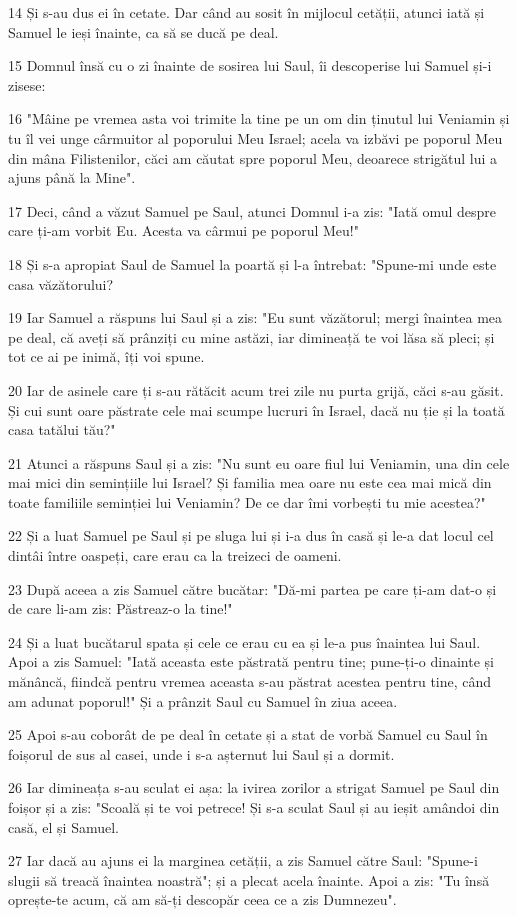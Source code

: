 \par 14 Și s-au dus ei în cetate. Dar când au sosit în mijlocul cetății, atunci iată și Samuel le ieși înainte, ca să se ducă pe deal.
\par 15 Domnul însă cu o zi înainte de sosirea lui Saul, îi descoperise lui Samuel și-i zisese:
\par 16 "Mâine pe vremea asta voi trimite la tine pe un om din ținutul lui Veniamin și tu îl vei unge cârmuitor al poporului Meu Israel; acela va izbăvi pe poporul Meu din mâna Filistenilor, căci am căutat spre poporul Meu, deoarece strigătul lui a ajuns până la Mine".
\par 17 Deci, când a văzut Samuel pe Saul, atunci Domnul i-a zis: "Iată omul despre care ți-am vorbit Eu. Acesta va cârmui pe poporul Meu!"
\par 18 Și s-a apropiat Saul de Samuel la poartă și l-a întrebat: "Spune-mi unde este casa văzătorului?
\par 19 Iar Samuel a răspuns lui Saul și a zis: "Eu sunt văzătorul; mergi înaintea mea pe deal, că aveți să prânziți cu mine astăzi, iar dimineață te voi lăsa să pleci; și tot ce ai pe inimă, îți voi spune.
\par 20 Iar de asinele care ți s-au rătăcit acum trei zile nu purta grijă, căci s-au găsit. Și cui sunt oare păstrate cele mai scumpe lucruri în Israel, dacă nu ție și la toată casa tatălui tău?"
\par 21 Atunci a răspuns Saul și a zis: "Nu sunt eu oare fiul lui Veniamin, una din cele mai mici din semințiile lui Israel? Și familia mea oare nu este cea mai mică din toate familiile seminției lui Veniamin? De ce dar îmi vorbești tu mie acestea?"
\par 22 Și a luat Samuel pe Saul și pe sluga lui și i-a dus în casă și le-a dat locul cel dintâi între oaspeți, care erau ca la treizeci de oameni.
\par 23 După aceea a zis Samuel către bucătar: "Dă-mi partea pe care ți-am dat-o și de care li-am zis: Păstreaz-o la tine!"
\par 24 Și a luat bucătarul spata și cele ce erau cu ea și le-a pus înaintea lui Saul. Apoi a zis Samuel: "Iată aceasta este păstrată pentru tine; pune-ți-o dinainte și mănâncă, fiindcă pentru vremea aceasta s-au păstrat acestea pentru tine, când am adunat poporul!" Și a prânzit Saul cu Samuel în ziua aceea.
\par 25 Apoi s-au coborât de pe deal în cetate și a stat de vorbă Samuel cu Saul în foișorul de sus al casei, unde i s-a așternut lui Saul și a dormit.
\par 26 Iar dimineața s-au sculat ei așa: la ivirea zorilor a strigat Samuel pe Saul din foișor și a zis: "Scoală și te voi petrece! Și s-a sculat Saul și au ieșit amândoi din casă, el și Samuel.
\par 27 Iar dacă au ajuns ei la marginea cetății, a zis Samuel către Saul: "Spune-i slugii să treacă înaintea noastră"; și a plecat acela înainte. Apoi a zis: "Tu însă oprește-te acum, că am să-ți descopăr ceea ce a zis Dumnezeu".

